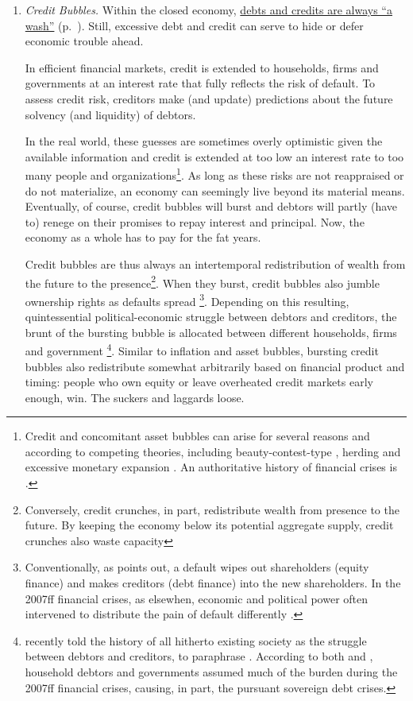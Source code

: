 \begin{enumerate}
	\item {} \label{it:creditbubbles} \emph{Credit Bubbles.} Within the closed economy, \hyperref[it:creditsdebitswash]{debts and credits are always ``a wash''} (p.~\pageref{it:creditsdebitswash}). Still, excessive debt and credit can serve to hide or defer economic trouble ahead.

	In efficient financial markets, credit is extended to households, firms and governments at an interest rate that fully reflects the risk of default. To assess credit risk, creditors make (and update) predictions about the future solvency (and liquidity) of debtors.

	In the real world, these guesses are sometimes overly optimistic given the available information and credit is extended at too low an interest rate to too many people and organizations\footnote{
		Credit and concomitant asset bubbles can arise for several reasons and according to competing theories, including beauty-contest-type \citep{Keynes1936}, herding \citep{Banerjee-1992-aa} and excessive monetary expansion \citep{Stiglitz2010}. An authoritative history of financial crises is \cite{KindlebergerAliber-2005-aa}.}.
	As long as these risks are not reappraised or do not materialize, an economy can seemingly live beyond its material means. Eventually, of course, credit bubbles will burst and debtors will partly (have to) renege on their promises to repay interest and principal. Now, the economy as a whole has to pay for the fat years.

	Credit bubbles are thus always an intertemporal redistribution of wealth from the future to the presence\footnote{
		Conversely, credit crunches, in part, redistribute wealth from presence to the future. By keeping the economy below its potential aggregate supply, credit crunches also waste capacity}.
	When they burst, credit bubbles also jumble ownership rights as defaults spread \citep{Stiglitz2010}\footnote{
		Conventionally, as \citeauthor{Stiglitz2010} points out, a default wipes out shareholders (equity finance) and makes creditors (debt finance) into the new shareholders. In the 2007ff financial crises, as elsewhen, economic and political power often intervened to distribute the pain of default differently \citep{Stiglitz2010}.}.
	Depending on this resulting, quintessential political-economic struggle between debtors and creditors, the brunt of the bursting bubble is allocated between different households, firms and government \citep{Coggan2011}\footnote{
		\citealt{Coggan2011} recently told the history of all hitherto existing society as the struggle between debtors and creditors, to paraphrase \cite{MarxEngels-1848-aa}. According to both \citeauthor{Coggan2011} and \cite{Stiglitz2010}, household debtors and governments assumed much of the burden during the 2007ff financial crises, causing, in part, the pursuant sovereign debt crises.}.
	Similar to inflation and asset bubbles, bursting credit bubbles also redistribute somewhat arbitrarily based on financial product and timing: people who own equity or leave overheated credit markets early enough, win. The suckers and laggards loose.


\end{enumerate}
